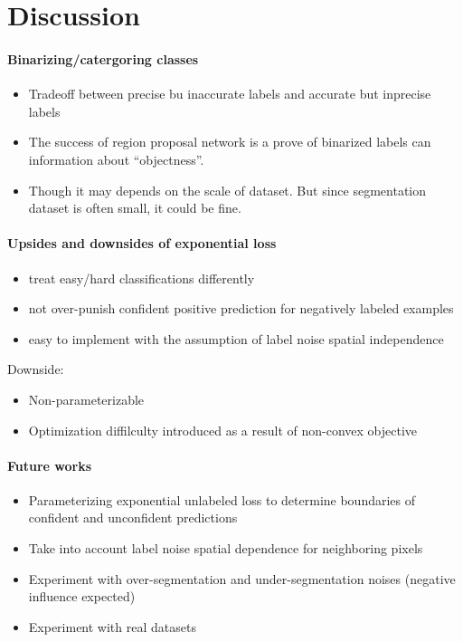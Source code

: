 \section{Discussion}
\label{sec:discussion}


\paragraph{Binarizing/catergoring classes}
\begin{itemize}
  \item Tradeoff between precise bu inaccurate labels and accurate but inprecise labels
  \item The success of region proposal network is a prove of binarized labels can information about ``objectness''.
  \item Though it may depends on the scale of dataset. But since segmentation dataset is often small, it could be fine.
\end{itemize}

\paragraph{Upsides and downsides of exponential loss}
\begin{itemize}
  \item treat easy/hard classifications differently
  \item not over-punish confident positive prediction for negatively labeled examples
  \item easy to implement with the assumption of label noise spatial independence
\end{itemize}


Downside:
\begin{itemize}
  \item Non-parameterizable
  \item Optimization diffilculty introduced as a result of non-convex objective
\end{itemize}


\paragraph{Future works}

\begin{itemize}
  \item Parameterizing exponential unlabeled loss to determine boundaries of confident and unconfident predictions
  \item Take into account label noise spatial dependence for neighboring pixels
  \item Experiment with over-segmentation and under-segmentation noises (negative influence expected)
  \item Experiment with real datasets
\end{itemize}
